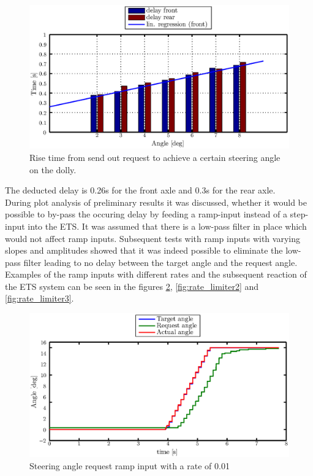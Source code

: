 \documentclass[ExampleMasters.tex]{subfiles}
\begin{document}
\begin{figure}[!hbt]
	\centering
	\includegraphics[width=1\linewidth]{figures/delay_testing_lin_interpolation}
	\caption{Rise time from send out request to achieve a certain steering angle on the dolly.}
	\label{fig:delay_testing_lin_interpolation}
\end{figure}
The deducted delay is 0.26s for the front axle and 0.3s for the rear axle.\\
During plot analysis of preliminary results it was discussed, whether it would be possible to by-pass the occuring delay by feeding a ramp-input instead of a step-input into the \gls{ETS}. It was assumed that there is a low-pass filter in place which would not affect ramp inputs. Subsequent tests with ramp inputs with varying slopes and amplitudes showed that it was indeed possible to eliminate the low-pass filter leading to no delay between the target angle and the request angle. Examples of the ramp inputs with different rates and the subsequent reaction of the \gls{ETS} system can be seen in the figures \ref{fig:rate_limiter1}, \ref{fig:rate_limiter2} and \ref{fig:rate_limiter3}.\\
\begin{figure}[!htb]
	\centering
	\includegraphics[width=1\linewidth]{figures/rate_limiter1}
	\caption{Steering angle request ramp input with a rate of 0.01}
	
	\label{fig:rate_limiter1}
\end{figure}
\end{document}
